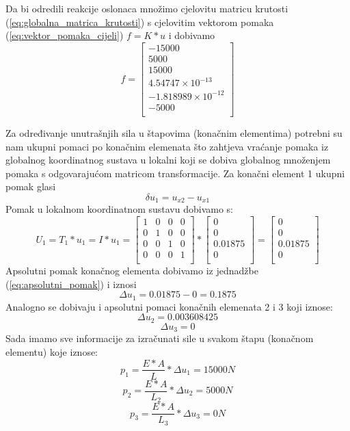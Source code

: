 \documentclass[a4paper,twoside,12pt]{memoir} %
\begin{document}
Da bi odredili reakcije oslonaca množimo cjelovitu matricu krutosti (\ref{eq:globalna_matrica_krutosti}) s cjelovitim vektorom pomaka (\ref{eq:vektor_pomaka_cijeli}) $f = K * u$ i dobivamo
\begin{equation}
\label{eq:reakcije_oslonaca}
    f =
    \begin{bmatrix}
    -15000 \\ 
    5000 \\ 
    15000 \\ 
    4.54747 \times 10^{-13} \\ 
    -1.818989 \times 10^{-12} \\ 
    -5000 \\
    \end{bmatrix}
\end{equation}

Za određivanje unutrašnjih sila u štapovima (konačnim elementima) potrebni su nam ukupni pomaci po konačnim elemenata što zahtjeva vraćanje pomaka iz globalnog koordinatnog sustava u lokalni koji se dobiva globalnog množenjem pomaka s odgovarajućom matricom transformacije. Za konačni element 1 ukupni pomak glasi 
\begin{equation}
\label{eq:apsolutni_pomak}
\delta u_1 = u_{x2} - u_{x1}
\end{equation}
Pomak u lokalnom koordinatnom sustavu dobivamo s:
\begin{equation}
\label{eq:transformacija_u_lokalni}
    U_1 = T_1 * u_1 = I * u_1 =
    \begin{bmatrix}
    1 & 0 & 0 & 0 \\
    0 & 1 & 0 & 0 \\
    0 & 0 & 1 & 0 \\
    0 & 0 & 0 & 1 \\
    \end{bmatrix} 
    *
    \begin{bmatrix}
    0 \\ 0 \\ 0.01875 \\ 0 \\
    \end{bmatrix}
    = 
    \begin{bmatrix}
    0 \\ 0 \\ 0.01875 \\ 0 \\
    \end{bmatrix}
\end{equation}
Apsolutni pomak konačnog elementa dobivamo iz jednadžbe (\ref{eq:apsolutni_pomak}) i iznosi $$\Delta u_1 = 0.01875 - 0 = 0.1875 $$
Analogno se dobivaju i apsolutni pomaci konačnih elemenata 2 i 3 koji iznose: 
$$\Delta u_2 = 0.003608425$$
$$\Delta u_3 = 0$$
Sada imamo sve informacije za izračunati sile u svakom štapu (konačnom elementu) koje iznose:
$$p_1 = \frac{E * A}{L} * \Delta u_1 = 15000 N$$
$$p_2 = \frac{E * A}{L_2} * \Delta u_2 = 5000 N$$
$$p_3 = \frac{E * A}{L_3} * \Delta u_3 = 0 N $$
\end{document}
